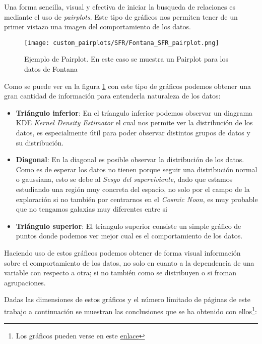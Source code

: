 \documentclass[11pt, a4paper]{article} %
\begin{document}
Una forma sencilla, visual y efectiva de iniciar la busqueda de relaciones es mediante el uso de \textit{pairplots}. Este tipo de gráficos nos permiten tener de un primer vistazo una imagen del comportamiento de los datos. 

\begin{figure}[H]
    \centering
    \texttt{[image: custom\_pairplots/SFR/Fontana\_SFR\_pairplot.png]}
    \caption{Ejemplo de Pairplot. En este caso se muestra un Pairplot para los datos de Fontana}
    \label{fig:pair_ex}
\end{figure}

Como se puede ver en la figura \ref{fig:pair_ex} con este tipo de gráficos podemos obtener una gran cantidad de información para entenderla naturaleza de los datos:

\begin{itemize}
    \item \textbf{Triángulo inferior}: En el tríangulo inferior podemos observar un diagrama KDE \textit{Kernel Density Estimator} el cual nos 
    permite ver la distribución de los datos, es especialmente útil para poder observar distintos grupos de datos y su distribución.
    \item \textbf{Diagonal}: En la diagonal es posible observar la distribución de los datos. Como es de esperar los datos no tienen porque seguir una distribución normal o gaussiana, esto se debe al \textit{Sesgo del superviviente}, dado que estamos estudiando
     una región muy concreta del espacio, no solo por el campo de la exploración si no también por centrarnos en el \textit{Cosmic Noon}, es muy probable que no tengamos galaxias muy diferentes entre si
    \item \textbf{Triángulo superior}: El triangulo superior consiste un simple gráfico de puntos donde podemos ver mejor cual es el comportamiento de los datos.
    
\end{itemize}

Haciendo uso de estos gráficos podemos obtener de forma visual información sobre el comportamiento de los datos, no solo en cuanto a la dependencia de una variable con respecto a otra; si no 
también como se distribuyen o si froman agrupaciones. 

Dadas las dimensiones de estos gráficos y el número límitado de páginas de este trabajo a continuación se muestran las conclusiones que se ha obtenido con ellos\footnote{Los gráficos pueden verse en este \href{https://github.com/PhyAMR/TFG/tree/main/custom_pairplots}{enlace}}:
\end{document}
